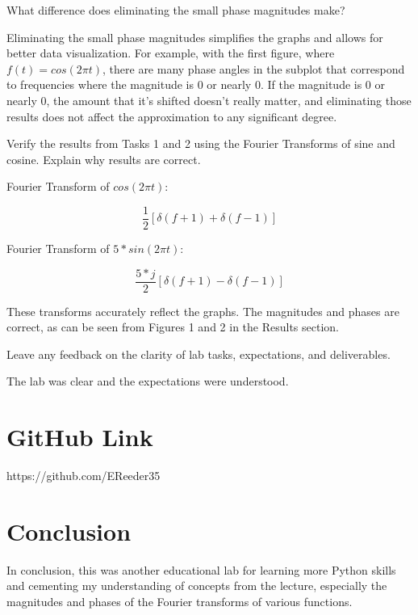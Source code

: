 \documentclass[12pt]{article}
\begin{document}
What difference does eliminating the small phase magnitudes make?

Eliminating the small phase magnitudes simplifies the graphs and allows for better data visualization. For example, with the first figure, where $f(t) = cos(2 \pi t)$, there are many phase angles in the subplot that correspond to frequencies where the magnitude is 0 or nearly 0. If the magnitude is 0 or nearly 0, the amount that it's shifted doesn't really matter, and eliminating those results does not affect the approximation to any significant degree.

Verify the results from Tasks 1 and 2 using the Fourier Transforms of sine and cosine. Explain why results are correct. 

Fourier Transform of $cos(2 \pi t)$:

\begin{equation}
    \frac{1}{2} [\delta (f+1) + \delta (f-1)]
\end{equation}

Fourier Transform of $5*sin(2 \pi t)$:

\begin{equation}
    \frac{5*j}{2} [\delta (f+1) - \delta (f-1)]
\end{equation}

These transforms accurately reflect the graphs. The magnitudes and phases are correct, as can be seen from Figures 1 and 2 in the Results section.

Leave any feedback on the clarity of lab tasks, expectations, and deliverables.

The lab was clear and the expectations were understood.

\section{GitHub Link}

https://github.com/EReeder35

\section{Conclusion}

In conclusion, this was another educational lab for learning more Python skills and cementing my understanding of concepts from the lecture, especially the magnitudes and phases of the Fourier transforms of various functions.
\end{document}
